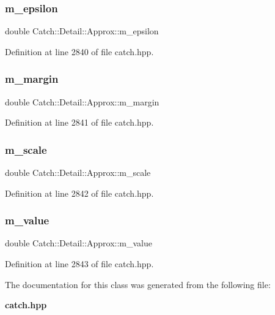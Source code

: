 \subsubsection{m\_epsilon}
{\footnotesize\ttfamily double Catch\+::\+Detail\+::\+Approx\+::m\+\_\+epsilon\hspace{0.3cm}{\ttfamily [private]}}



Definition at line 2840 of file catch.\+hpp.

\mbox{\label{class_catch_1_1_detail_1_1_approx_a4262a7e821eec507b424c335121ea0d8}} 
\subsubsection{m\_margin}
{\footnotesize\ttfamily double Catch\+::\+Detail\+::\+Approx\+::m\+\_\+margin\hspace{0.3cm}{\ttfamily [private]}}



Definition at line 2841 of file catch.\+hpp.

\mbox{\label{class_catch_1_1_detail_1_1_approx_a65e9bdab9113ff3300b45f0a4e048dd7}} 
\subsubsection{m\_scale}
{\footnotesize\ttfamily double Catch\+::\+Detail\+::\+Approx\+::m\+\_\+scale\hspace{0.3cm}{\ttfamily [private]}}



Definition at line 2842 of file catch.\+hpp.

\mbox{\label{class_catch_1_1_detail_1_1_approx_af7aeef703bd591f5ec85407b1dac053c}} 
\subsubsection{m\_value}
{\footnotesize\ttfamily double Catch\+::\+Detail\+::\+Approx\+::m\+\_\+value\hspace{0.3cm}{\ttfamily [private]}}



Definition at line 2843 of file catch.\+hpp.



The documentation for this class was generated from the following file\+:\begin{DoxyCompactItemize}
\item 
\textbf{ catch.\+hpp}\end{DoxyCompactItemize}

